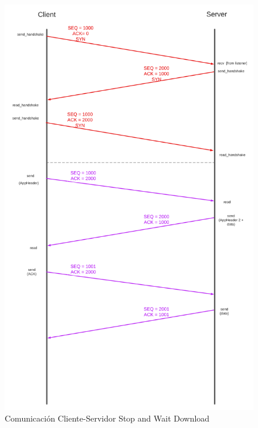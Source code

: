 \documentclass[11pt,a4paper]{article}
\begin{document}
\begin{figure}[H]
    \centering
    \begin{center}
    \includegraphics[width=13cm]
    {images/implementacion/comunicacion_general_SAW_download.png}
    \end{center}
    \caption{Comunicación Cliente-Servidor Stop and Wait Download}
\end{figure}

\newpage
\end{document}
